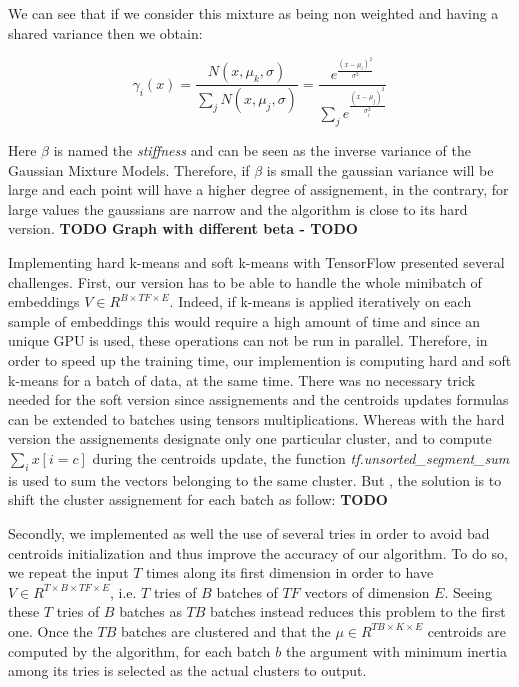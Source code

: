 \documentclass[master, tikz, final,11pt, dvipdfmx]{iscs-thesis}
\begin{document}
We can see that if we consider this mixture as being non weighted and having a shared variance then we obtain:

\[
\gamma_i(x) = \frac{N(x, \mu_k,\sigma)}{\sum_j N(x, \mu_j,\sigma)} = \frac{e^{\frac{(x-\mu_i)^2}{\sigma^2}}}{\sum_j e^{\frac{(x-\mu_j)^2}{\sigma_i^2}}} 
\]



Here $\beta$ is named the \textit{stiffness} and can be seen as the inverse variance of the Gaussian Mixture Models. Therefore, if $\beta$ is small the gaussian variance will be large and each point will have a higher degree of assignement, in the contrary, for large values the gaussians are narrow and the algorithm is close to its hard version.
\textbf{TODO}
\textbf{Graph with different beta - TODO}

Implementing hard k-means and soft k-means with TensorFlow presented several challenges. First, our version has to be able to handle the whole minibatch of embeddings $V\in R^{B\times TF \times E}$. Indeed, if k-means is applied iteratively on each sample of embeddings this would require a high amount of time and since an unique GPU is used, these operations can not be run in parallel. Therefore, in order to speed up the training time, our implemention is computing hard and soft k-means for a batch of data, at the same time. There was no necessary trick needed for the soft version since assignements and the centroids updates formulas can be extended to batches using tensors multiplications. Whereas with the hard version the assignements designate only one particular cluster, and to compute $\sum_i x[i = c]$ during the centroids update, the function \textit{tf.unsorted\_segment\_sum} is used to sum the vectors belonging to the same cluster. But , the solution is to shift the cluster assignement for each batch as follow:
\textbf{TODO}

Secondly, we implemented as well the use of several tries in order to avoid bad centroids initialization and thus improve the accuracy of our algorithm. To do so, we repeat the input $T$ times along its first dimension in order to have $V\in R^{T \times B\times TF \times E}$, i.e. $T$ tries of $B$ batches of $TF$ vectors of dimension $E$. Seeing these $T$ tries of $B$ batches as $TB$ batches instead reduces this problem to the first one. Once the $TB$ batches are clustered and that the $\mu \in R^{TB\times K \times E}$ centroids are computed by the algorithm, for each batch $b$ the argument with minimum inertia among its tries is selected as the actual clusters to output.
\end{document}
